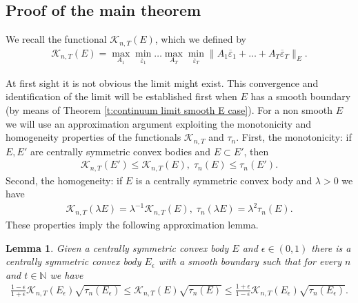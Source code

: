 \documentclass[reqno]{amsart}
\newtheorem{lemma}[theorem]{Lemma}
\numberwithin{equation}{section}
\begin{document}
\subsection{Proof of the main theorem} We recall the functional $\mathcal{K}_{n,T}(E)$, which we defined by
\begin{align*}
  \mathcal{K}_{n,T}(E) = \max_{A_1}\min_{\overline \varepsilon_1}\ldots\max_{A_T}\min_{\overline \varepsilon_T}\|A_1\overline \varepsilon_1+\ldots+A_T\overline \varepsilon_T\|_E.  
\end{align*}

At first sight it is not obvious the limit might exist. This convergence and identification of the limit will be established first when $E$ has a smooth boundary (by means of Theorem \ref{t:continuum limit smooth E case}). For a non smooth $E$ we will use an approximation argument exploiting the monotonicity and homogeneity properties of the functionals $\mathcal{K}_{n,T}$ and $\tau_n$.  First, the monotonicity: if $E,E'$ are centrally symmetric convex bodies and $E \subset E'$, then 
\begin{align*}
  \mathcal{K}_{n,T}(E') \leq \mathcal{K}_{n,T}(E),\; \tau_n(E) \leq \tau_n(E').
\end{align*}
Second, the homogeneity: if $E$ is a centrally symmetric convex body and $\lambda>0$ we have 
\begin{align*}
  \mathcal{K}_{n,T}(\lambda E) = \lambda^{-1} \mathcal{K}_{n,T}(E),\; \tau_n(\lambda E) = \lambda^2 \tau_n(E).    
\end{align*}
These properties imply the following approximation lemma.

\begin{lemma}\label{l:approximation lemma}
    Given a centrally symmetric convex body $E$ and $\epsilon \in (0,1)$ there is a centrally symmetric convex body $E_\epsilon$ with a smooth boundary such that for every $n$ and $t\in \mathbb{N}$ we have
    \begin{align*}
      \frac{1-\epsilon}{1+\epsilon} \mathcal{K}_{n,T}(E_\epsilon)\sqrt{\tau_n(E_\epsilon)} \leq \mathcal{K}_{n,T}(E)\sqrt{\tau_n(E)} \leq  \frac{1+\epsilon}{1-\epsilon} \mathcal{K}_{n,T}(E_\epsilon)\sqrt{\tau_n(E_\epsilon)}.    
    \end{align*}

\end{lemma}
\end{document}

